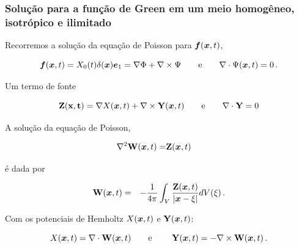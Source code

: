 \documentclass{beamer}
\newcommand{\xvec}{\vc{x}}
\newcommand{\evec}{\vc{e}}
\newcommand{\fvec}{\vc{f}}
\newcommand{\xivec}{\boldmath \xi}
\begin{document}
\begin{frame}
	\frametitle{\textbf{Solu\c{c}\~ao para a fun\c{c}\~ao de Green em um meio homog\^eneo, isotr\'opico e ilimitado}}
	
	\begin{flushleft}
		Recorremos a solu\c{c}\~ao da equa\c{c}\~ao de Poisson para $\fvec(\xvec,t)$,
	\end{flushleft}   
	\begin{equation*}
	\label{ten1}
	\fvec(\xvec,t) = X_{0}(t)\delta(\xvec)\evec_1 = \nabla \Phi + \nabla \times \Psi \quad\quad \mbox{e} \quad\quad    \nabla \cdot \Psi(\xvec,t) = 0 \, .
	\end{equation*}
	\begin{flushleft}
		Um termo de fonte
	\end{flushleft}
	\begin{equation*}     
	\mathbf{Z(\xvec,t)} = \nabla X(\xvec,t) + \nabla \times \mathbf{Y}(\xvec,t) \qquad \mbox{e} \qquad
	\nabla \cdot \mathbf{Y} = 0
	\end{equation*}
	\begin{flushleft}
		A solu\c{c}\~ao da equa\c{c}\~ao de Poisson,
	\end{flushleft}       
	\begin{align*}     
	\nabla^2 \mathbf{W}(\xvec,t) =&  \mathbf{Z}(\xvec,t)\, 
	\end{align*}  
	\begin{flushleft}  
		\'e dada por
	\end{flushleft}
	\begin{eqnarray}
	\label{ten1}
	\mathbf{W}(\xvec,t) &=& - \frac{1}{4\pi} \int_{V} \frac{\mathbf{Z}(\xvec,t)}{\left| \xvec - \xivec \right|} dV(\xivec)\, .
	\end{eqnarray}
	\begin{flushleft}
		Com os potenciais de Hemholtz $X(\xvec,t)$ e $\mathbf{Y}(\xvec,t)$:
	\end{flushleft}
	\begin{equation*}          
	X(\xvec,t) = \nabla \cdot \mathbf{W}(\xvec,t) \qquad \mbox{e } \qquad
	\mathbf{Y}(\xvec,t) =- \nabla \times \mathbf{W}(\xvec,t)\, .
	\end{equation*}         
	
\end{frame}%
\end{document}
